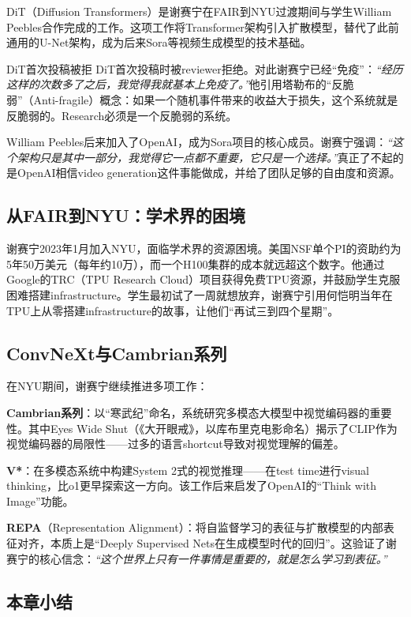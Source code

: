 \documentclass[a4paper]{article}
\begin{document}
DiT（Diffusion Transformers）是谢赛宁在FAIR到NYU过渡期间与学生William Peebles合作完成的工作。这项工作将Transformer架构引入扩散模型，替代了此前通用的U-Net架构，成为后来Sora等视频生成模型的技术基础。

\begin{warningbox}{DiT首次投稿被拒}
DiT首次投稿时被reviewer拒绝。对此谢赛宁已经``免疫''：\textit{``经历这样的次数多了之后，我觉得我就基本上免疫了。''}他引用塔勒布的``反脆弱''（Anti-fragile）概念：如果一个随机事件带来的收益大于损失，这个系统就是反脆弱的。Research必须是一个反脆弱的系统。
\end{warningbox}

William Peebles后来加入了OpenAI，成为Sora项目的核心成员。谢赛宁强调：\textit{``这个架构只是其中一部分，我觉得它一点都不重要，它只是一个选择。''}真正了不起的是OpenAI相信video generation这件事能做成，并给了团队足够的自由度和资源。

\subsection{从FAIR到NYU：学术界的困境}

谢赛宁2023年1月加入NYU，面临学术界的资源困境。美国NSF单个PI的资助约为5年50万美元（每年约10万），而一个H100集群的成本就远超这个数字。他通过Google的TRC（TPU Research Cloud）项目获得免费TPU资源，并鼓励学生克服困难搭建infrastructure。学生最初试了一周就想放弃，谢赛宁引用何恺明当年在TPU上从零搭建infrastructure的故事，让他们``再试三到四个星期''。

\subsection{ConvNeXt与Cambrian系列}

在NYU期间，谢赛宁继续推进多项工作：

\textbf{Cambrian系列}：以``寒武纪''命名，系统研究多模态大模型中视觉编码器的重要性。其中Eyes Wide Shut（《大开眼戒》，以库布里克电影命名）揭示了CLIP作为视觉编码器的局限性——过多的语言shortcut导致对视觉理解的偏差。

\textbf{V*}：在多模态系统中构建System 2式的视觉推理——在test time进行visual thinking，比o1更早探索这一方向。该工作后来启发了OpenAI的``Think with Image''功能。

\textbf{REPA}（Representation Alignment）：将自监督学习的表征与扩散模型的内部表征对齐，本质上是``Deeply Supervised Nets在生成模型时代的回归''。这验证了谢赛宁的核心信念：\textit{``这个世界上只有一件事情是重要的，就是怎么学习到表征。''}

\subsection{本章小结}
\end{document}
